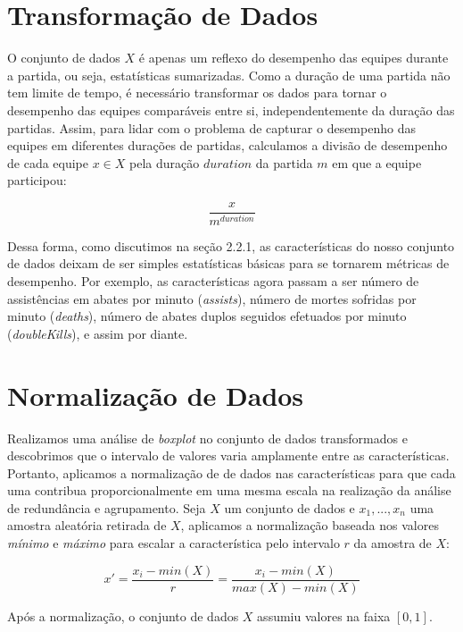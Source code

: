 \section{Transformação de Dados}
O conjunto de dados $X$ é apenas um reflexo do desempenho das equipes durante a partida, ou seja, estatísticas sumarizadas. Como a duração de uma partida não tem limite de tempo, é necessário transformar os dados para tornar o desempenho das equipes comparáveis entre si, independentemente da duração das partidas. Assim, para lidar com o problema de capturar o desempenho das equipes em diferentes durações de partidas, calculamos a divisão de desempenho de cada equipe $x \in X$ pela duração $duration$ da partida $m$ em que a equipe participou:

\begin{displaymath}
  \frac{x}{m^{duration}}
\end{displaymath}

Dessa forma, como discutimos na seção 2.2.1, as características do nosso conjunto de dados deixam de ser simples estatísticas básicas para se tornarem métricas de desempenho. Por exemplo, as características agora passam a ser número de assistências em abates por minuto (\textit{assists}), número de mortes sofridas por minuto (\textit{deaths}), número de abates duplos seguidos efetuados por minuto (\textit{doubleKills}), e assim por diante.

\section{Normalização de Dados}
Realizamos uma análise de \textit{boxplot} no conjunto de dados transformados e descobrimos que o intervalo de valores varia amplamente entre as características. Portanto, aplicamos a normalização de de dados \cite{zaki2014data} nas características para que cada uma contribua proporcionalmente em uma mesma escala na realização da análise de redundância e agrupamento. Seja $X$ um conjunto de dados e $x_1, ..., x_n $ uma amostra aleatória retirada de $X$, aplicamos a normalização baseada nos valores \textit{mínimo} e \textit{máximo} para escalar a característica pelo intervalo $r$ da amostra de $X$:

\begin{displaymath}
  x'=\frac{x_i - min(X)}{r}=\frac{x_i - min(X)}{max(X)-min(X)}
\end{displaymath}

Após a normalização, o conjunto de dados $X$ assumiu valores na faixa $[0, 1]$.


